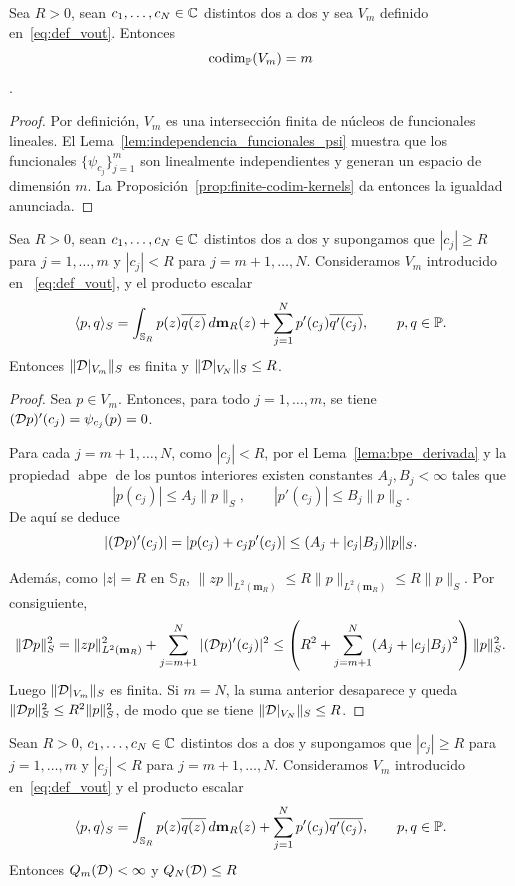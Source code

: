 \begin{lem}\label{lem:vout_codimension}
	Sea $R>0$, sean $c_1,\dots,c_N\in\mathbb{C}$ distintos dos a dos y sea $V_m$ definido en~\ref{eq:def_vout}. Entonces $$\operatorname{codim}_{\mathbb{P}}(V_m)=m$$.
\end{lem}

\begin{proof}
	Por definición, $V_m$ es una intersección finita de núcleos de funcionales lineales. El Lema~\ref{lem:independencia_funcionales_psi} muestra que los funcionales $\{\psi_{c_j}\}_{j=1}^m$ son linealmente independientes y generan un espacio de dimensión $m$. La Proposición~\ref{prop:finite-codim-kernels} da entonces la igualdad anunciada.
\end{proof}

\begin{lem}\label{lem:vout_acotacion}
	Sea $R>0$, sean $c_1,\dots,c_N\in\mathbb{C}$ distintos dos a dos y supongamos que $|c_j|\ge R$ para $j=1,\dots,m$ y $|c_j|<R$ para $j=m+1,\dots,N$. Consideramos $V_m$ introducido en ~\ref{eq:def_vout}, y el producto escalar
	\[
		\langle p,q\rangle_S
		=
		\int_{\mathbb{S}_R} p(z)\overline{q(z)}\,d\mathbf{m}_R(z)
		+
		\sum_{j=1}^N p'(c_j)\overline{q'(c_j)},
		\qquad p,q\in\mathbb{P}.
	\]
	Entonces $\|\mathcal{D}|_{V_m}\|_S$ es finita y $\|\mathcal{D}|_{V_N}\|_S\leq R$.
\end{lem}

\begin{proof}
	Sea $p\in V_m$. Entonces, para todo $j=1,\dots,m$, se tiene $(\mathcal{D} p)'(c_j)=\psi_{c_j}(p)=0$.

	Para cada $j=m+1,\dots,N$, como $|c_j|<R$, por el Lema~\ref{lema:bpe_derivada} y la propiedad $\operatorname{abpe}$ de los puntos interiores existen constantes $A_j,B_j<\infty$ tales que
	\[
		|p(c_j)|\le A_j\|p\|_S,
		\qquad
		|p'(c_j)|\le B_j\|p\|_S.
	\]
	De aquí se deduce
	\[
		|(\mathcal{D} p)'(c_j)|=|p(c_j)+c_jp'(c_j)|\le (A_j+|c_j|B_j)\|p\|_S.
	\]

	Además, como $|z|=R$ en $\mathbb{S}_R$, $\|zp\|_{L^2(\mathbf{m}_R)}\le R\|p\|_{L^2(\mathbf{m}_R)}\le R\|p\|_S$.
	Por consiguiente,
	\[
		\|\mathcal{D} p\|_S^2
		=
		\|zp\|_{L^2(\mathbf{m}_R)}^2
		+
		\sum_{j=m+1}^N |(\mathcal{D} p)'(c_j)|^2
		\le
		\left(R^2+\sum_{j=m+1}^N (A_j+|c_j|B_j)^2\right)\|p\|_S^2.
	\]
	Luego $\|\mathcal{D}|_{V_m}\|_S$ es finita. Si $m=N$, la suma anterior desaparece y queda $\|\mathcal{D} p\|_S^2\le R^2\|p\|_S^2$,
	de modo que se tiene $\|\mathcal{D}|_{V_N}\|_S\leq R$.
\end{proof}

\begin{prop}\label{prop:umbral_fase1}
	Sean $R>0$, $c_1,\dots,c_N\in\mathbb{C}$ distintos dos a dos y supongamos que $|c_j|\ge R$ para $j=1,\dots,m$ y $|c_j|<R$ para $j=m+1,\dots,N$. Consideramos $V_m$ introducido en~\ref{eq:def_vout} y el producto escalar
	\[
		\langle p,q\rangle_S
		=
		\int_{\mathbb{S}_R} p(z)\overline{q(z)}\,d\mathbf{m}_R(z)
		+
		\sum_{j=1}^N p'(c_j)\overline{q'(c_j)},
		\qquad p,q\in\mathbb{P}.
	\]
	Entonces $Q_m(\mathcal{D})<\infty$ y $Q_N(\mathcal{D}) \leq R$
\end{prop}

